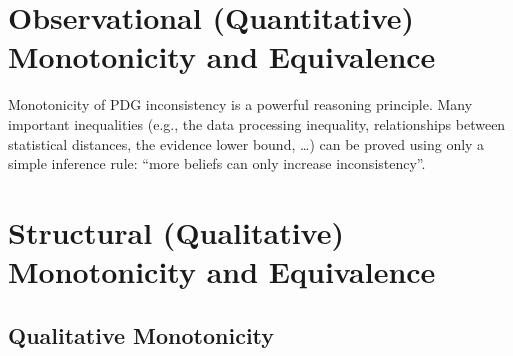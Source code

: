 \section{Observational (Quantitative) Monotonicity and Equivalence}
    \label{sec:quant-monotone}

Monotonicity of PDG inconsistency \citep{one-true-loss}
is a powerful reasoning principle. Many important inequalities (e.g., the data processing inequality, relationships between statistical distances, the evidence lower bound, \ldots) can be proved using only a simple inference rule: ``more beliefs can only increase inconsistency''.


\section{Structural (Qualitative) Monotonicity and Equivalence}
\subsection{Qualitative Monotonicity}
    \label{sec:qual-monotone}



